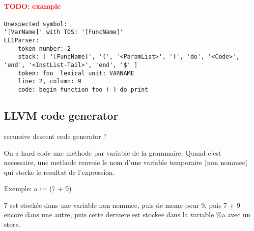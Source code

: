 \documentclass[11pt]{article}
\newcommand\todo[1]{\textcolor{red}{TODO: #1}}
\begin{document}
\paragraph*{\todo{example}}
\begin{verbatim}
Unexpected symbol:
'[VarName]' with TOS: '[FuncName]'
LL1Parser:
    token number: 2
    stack: [ '[FuncName]', '(', '<ParamList>', ')', 'do', '<Code>', 'end', '<InstList-Tail>', 'end', '$' ]
    token: foo  lexical unit: VARNAME
    line: 2, column: 9
    code: begin function foo ( ) do print
\end{verbatim}

\subsection{LLVM code generator}

recursive descent code generator ?

On a hard code une methode par variable de la grammaire.
Quand c'est necessaire, une methode renvoie le nom d'une variable temporaire (non nommee)
qui stocke le resultat de l'expression.

Exemple: a := (7 + 9)

7 est stockée dans une variable non nommee, puis de meme pour 9, puis 7 + 9 encore dans une autre, puis cette derniere est stockee
dans la variable \%a avec un store.
\end{document}
